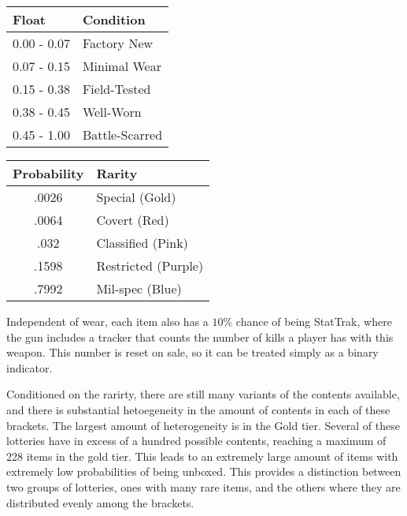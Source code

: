 \documentclass[12pt]{paper}
\begin{document}
\begin{table*}[!htb]
    \begin{minipage}{.5\linewidth}
      \caption{Condition Probabilities}
      \centering
        \begin{tabular}{|l|l|}\hline
          Float & Condition\\\hline
          0.00 - 0.07 & Factory New\\
          0.07 - 0.15 & Minimal Wear\\
          0.15 - 0.38 & Field-Tested\\
          0.38 - 0.45 & Well-Worn\\
          0.45 - 1.00 & Battle-Scarred\\\hline
\end{tabular}
    \end{minipage}%
    \begin{minipage}{.5\linewidth}
      \centering
        \caption{Rarity Probabilities}
        \begin{tabular}{|c|l|}\hline
          Probability & Rarity\\\hline
          .0026 & Special (Gold)\\
          .0064 & Covert (Red)\\
          .032 & Classified (Pink)\\
          .1598 & Restricted (Purple)\\
          .7992 & Mil-spec (Blue)\\\hline
\end{tabular}
    \end{minipage} 
\end{table*}

Independent of wear, each item
also has a $10\%$ chance of being StatTrak\texttrademark, where the
gun includes a tracker that counts the number of kills a player has
with this weapon. This number is reset on sale, so it can be treated
simply as a binary indicator.

Conditioned on the rarirty, there are still many variants of the
contents available, and there is substantial hetoegeneity in the
amount of contents in each of these brackets. The largest amount of
heterogeneity is in the Gold tier.  Several of these lotteries have in
excess of a hundred possible contents, reaching a maximum of 228 items
in the gold tier. This leads to an extremely large amount of items
with extremely low probabilities of being unboxed. This provides a
distinction between two groups of lotteries, ones with many rare
items, and the others where they are distributed evenly among the
brackets.
\end{document}
